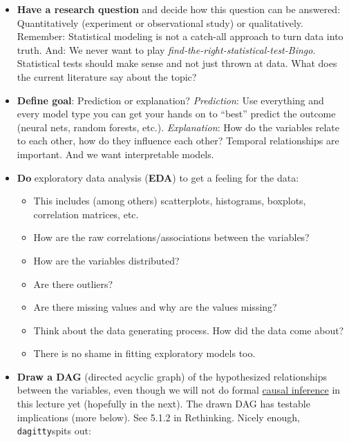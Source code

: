 \documentclass[
]{book}
\providecommand{\tightlist}{%
  \setlength{\itemsep}{0pt}\setlength{\parskip}{0pt}}
\begin{document}
\begin{itemize}
\item
  \textbf{Have a research question} and decide how this question can be answered:
  Quantitatively (experiment or observational study) or
  qualitatively.
  Remember: Statistical modeling is not a catch-all approach to
  turn data into truth.
  And: We never want to play \emph{find-the-right-statistical-test-Bingo}.
  Statistical tests should make sense and not just thrown at data.
  What does the current literature say about the topic?
\item
  \textbf{Define goal}: Prediction or explanation?
  \emph{Prediction}: Use everything and every model type you can get your hands
  on to ``best'' predict the outcome (neural nets, random forests, etc.).
  \emph{Explanation}: How do the variables relate to each other,
  how do they influence each other? Temporal relationships are important.
  And we want interpretable models.
\item
  \textbf{Do} exploratory data analysis (\textbf{EDA}) to get a feeling for the data:

  \begin{itemize}
  \tightlist
  \item
    This includes (among others) scatterplots, histograms, boxplots,
    correlation matrices, etc.
  \item
    How are the raw correlations/associations between the variables?
  \item
    How are the variables distributed?
  \item
    Are there outliers?
  \item
    Are there missing values and why are the values missing?
  \item
    Think about the data generating process. How did the data come about?
  \item
    There is no shame in fitting exploratory models too.
  \end{itemize}
\item
  \textbf{Draw a DAG} (directed acyclic graph) of the hypothesized relationships between
  the variables, even though we will not do formal
  \href{https://miguelhernan.org/whatifbook}{causal inference} in this lecture yet
  (hopefully in the next).
  The drawn DAG has testable implications (more below). See 5.1.2 in Rethinking.
  Nicely enough, \texttt{dagitty}spits out:


\end{itemize}
\end{document}
